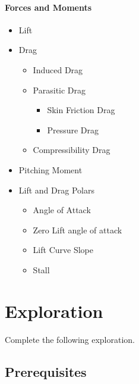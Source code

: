 \documentclass[11pt,twocolumn]{article}
\begin{document}
\paragraph{Forces and Moments}
\begin{itemize}
	\item Lift
	\item Drag
	\begin{itemize}
		\item Induced Drag
		\item Parasitic Drag
		\begin{itemize}
			\item Skin Friction Drag
			\item Pressure Drag
		\end{itemize}
		\item Compressibility Drag
	\end{itemize}
	\item Pitching Moment
	\item Lift and Drag Polars
	\begin{itemize}
		\item Angle of Attack
		\item Zero Lift angle of attack
		\item Lift Curve Slope
		\item Stall
	\end{itemize}
\end{itemize}




\section{Exploration}
\label{sec:exploration}

Complete the following exploration.

\subsection{Prerequisites}
\label{ssec:prereqs}
\end{document}
